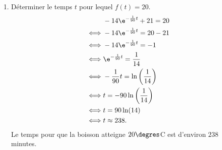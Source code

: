 \begin{enumerate}[start=2]
Cela signifie que la température du contenu de la tasse tendra vers $21\degres$C, la température de l'air ambiant.

\item Déterminer le temps $t$ pour lequel $f(t) = 20$.
\begin{align*}
&-14\e^{-\frac{1}{90}t} + 21 = 20 \\
\iff &-14\e^{-\frac{1}{90}t} = 20 - 21 \\
\iff &-14\e^{-\frac{1}{90}t} = -1 \\
\iff &\e^{-\frac{1}{90}t} = \dfrac{1}{14} \\
\iff &-\dfrac{1}{90}t = \ln\left(\dfrac{1}{14}\right) \\
\iff &t = -90 \ln\left(\frac{1}{14}\right) \\
\iff &t = 90 \ln(14) \\
\iff &t \approx 238.
\end{align*}
Le temps pour que la boisson atteigne $20\degres$C est d'environ $238$ minutes.
\end{enumerate}

\bigskip
